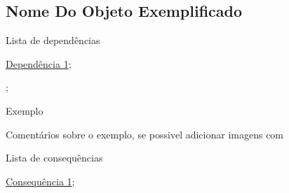 \subsection{Nome Do Objeto Exemplificado}
\label{nome-do-objeto-ex}
\begin{titlemize}{Lista de dependências}
	\item \hyperref[dependecia1]{Dependência 1};\\ %
	\item \hyperref[]{};\\
\end{titlemize}

\begin{ex}
	Exemplo 
\end{ex}

Comentários sobre o exemplo, se possivel adicionar imagens com 

\begin{titlemize}{Lista de consequências}
	\item \hyperref[consequencia1]{Consequência 1};\\ %
	\item \hyperref[]{}
\end{titlemize}



